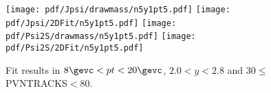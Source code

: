 \begin{figure}[H]
\begin{center}
\texttt{[image: pdf/Jpsi/drawmass/n5y1pt5.pdf]}
\texttt{[image: pdf/Jpsi/2DFit/n5y1pt5.pdf]}
\vspace*{-0.5cm}
\texttt{[image: pdf/Psi2S/drawmass/n5y1pt5.pdf]}
\texttt{[image: pdf/Psi2S/2DFit/n5y1pt5.pdf]}
\vspace*{-0.5cm}
\end{center}
\caption{Fit results in $8\gevc<pt<20\gevc$, $2.0<y<2.8$ and 30$\leq$PVNTRACKS$<$80.}
\label{Fitn5y1pt5}
\end{figure}
